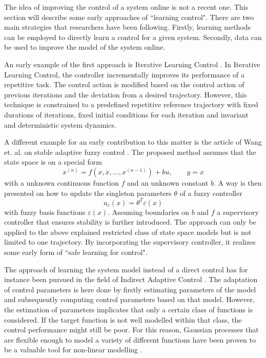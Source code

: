 \documentclass[../main.tex]{subfiles}
\begin{document}
The idea of improving the control of a system online is not a recent one. This section will describe some early approaches of ``learning control". There are two main strategies that researchers have been following. Firstly, learning methods can be employed to directly learn a control for a given system. Secondly, data can be used to improve the model of the system online.\par

An early example of the first approach is Iterative Learning Control \cite{aastrom2013adaptive}. In Iterative Learning Control, the controller incrementally improves its performance of a repetitive task. The control action is modified based on the control action of previous iterations and the deviation from a desired trajectory. However, this technique is constrained to a predefined repetitive reference trajectory with fixed durations of iterations, fixed initial conditions for each iteration and invariant and deterministic system dynamics.

A different example for an early contribution to this matter is the article of Wang et. al. on stable adaptive fuzzy control \cite{wang1993stable}. The proposed method assumes that the state space is on a special form
\begin{equation}
    x^{(n)} = f(x, \dot{x}, ..., x^{(n-1)})+bu, \qquad y=x
\end{equation}
with a unknown continuous function $f$ and an unknown constant $b$. A way is then presented on how to update the singleton parameters $\theta$ of a fuzzy controller
\begin{equation}
    u_c(x) = \theta^T \varepsilon(x)
\end{equation}
with fuzzy basis functions $\varepsilon(x)$. Assuming boundaries on $b$ and $f$ a supervisory controller that ensures stability is further introduced. The approach can only be applied to the above explained restricted class of state space models but is not limited to one trajectory. By incorporating the supervisory controller, it realizes some early form of ``safe learning for control".\par


The approach of learning the system model instead of a direct control has for instance been pursued in the field of Indirect Adaptive Control \cite{aastrom2013adaptive}. The adaptation of control parameters is here done by firstly estimating parameters of the model and subsequently computing control parameters based on that model. However, the estimation of parameters implicates that only a certain class of functions is considered. If the target function is not well modelled within that class, the control performance might still be poor. For this reason, Gaussian processes that are flexible enough to model a variety of different functions have been proven to be a valuable tool for non-linear modelling \cite{murphy2012machine}.\par
\end{document}
